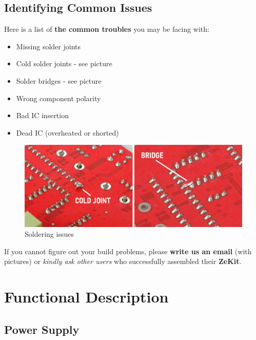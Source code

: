 \documentclass{scrartcl}
\begin{document}
\subsection{Identifying Common Issues}

Here is a list of \textbf{the common troubles} you may be facing with:

\begin{itemize}
    \item Missing solder joints
    \item Cold solder joints - see picture
    \item Solder bridges - see picture
    \item Wrong component polarity
    \item Bad IC insertion
    \item Dead IC (overheated or shorted)
\end{itemize}

\vspace{0.50cm}

\begin{figure}[!ht]
    \begin{center}
        \includegraphics[scale=0.42]{assets/solder-issues.jpg}
        \caption{Soldering issues}
    \end{center}
\end{figure}

If you cannot figure out your build problems, please \textbf{write us an email} (with pictures) or \emph{kindly ask other users} who successfully assembled their \textbf{ZeKit}.

\pagebreak

\section{Functional Description}

\subsection{Power Supply}
\end{document}

